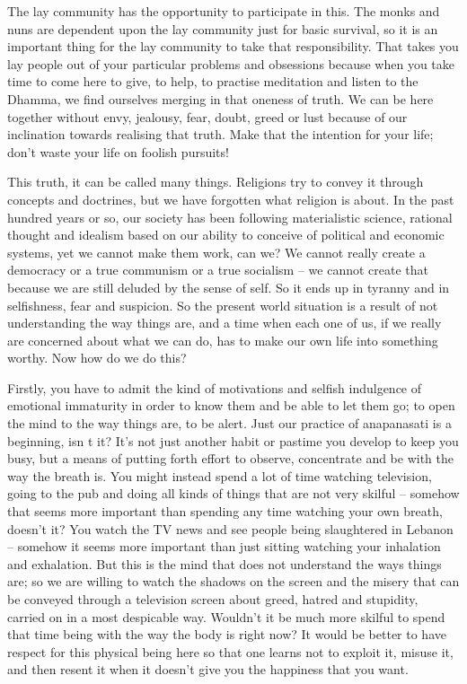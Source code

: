 The lay community has the opportunity to participate in this. The monks and nuns are dependent upon the lay community just for basic survival, so it is an important thing for the lay community to take that responsibility. That takes you lay people out of your particular problems and obsessions because when you take time to come here to give, to help, to practise meditation and listen to the Dhamma, we find ourselves merging in that oneness of truth. We can be here together without envy, jealousy, fear, doubt, greed or lust because of our inclination towards realising that truth. Make that the intention for your life; don't waste your life on foolish pursuits!

This truth, it can be called many things. Religions try to convey it through concepts and doctrines, but we have forgotten what religion is about. In the past hundred years or so, our society has been following materialistic science, rational thought and idealism based on our ability to conceive of political and economic systems, yet we cannot make them work, can we? We cannot really create a democracy or a true communism or a true socialism -- we cannot create that because we are still deluded by the sense of self. So it ends up in tyranny and in selfishness, fear and suspicion. So the present world situation is a result of not understanding the way things are, and a time when each one of us, if we really are concerned about what we can do, has to make our own life into something worthy. Now how do we do this?

Firstly, you have to admit the kind of motivations and selfish indulgence of emotional immaturity in order to know them and be able to let them go; to open the mind to the way things are, to be alert. Just our practice of anapanasati is a beginning, isn t it? It's not just another habit or pastime you develop to keep you busy, but a means of putting forth effort to observe, concentrate and be with the way the breath is. You might instead spend a lot of time watching television, going to the pub and doing all kinds of things that are not very skilful -- somehow that seems more important than spending any time watching your own breath, doesn't it? You watch the TV news and see people being slaughtered in Lebanon -- somehow it seems more important than just sitting watching your inhalation and exhalation. But this is the mind that does not understand the ways things are; so we are willing to watch the shadows on the screen and the misery that can be conveyed through a television screen about greed, hatred and stupidity, carried on in a most despicable way. Wouldn't it be much more skilful to spend that time being with the way the body is right now? It would be better to have respect for this physical being here so that one learns not to exploit it, misuse it, and then resent it when it doesn't give you the happiness that you want.


